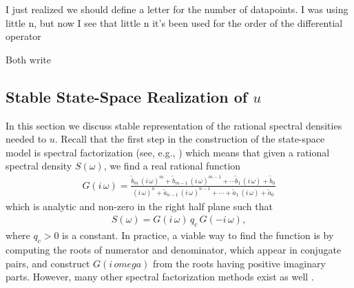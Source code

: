 \documentclass[journal]{IEEEtran}
\newcommand{\mauricio}[1]{{\color{blue}#1}}
\newcommand{\simo}[1]{{\color{red}#1}}
\begin{document}
\mauricio{I just realized we should define a letter for the number of datapoints. I was using little n, but now I see
that little n it's been used for the order of the differential operator}

\simo{Both write}

\subsection{Stable State-Space Realization of $u$}
%
In this section we discuss stable representation of the rational spectral densities needed to $u$. Recall that the first step in the construction of the state-space model is spectral factorization (see, e.g., \cite{Hartikainen+Sarkka:2010, Sarkka+Hartikainen:2012, Sarkka+Solin+Hartikainen:2013}) which means that given a rational spectral density $S(\omega)$, we find a real rational function
%
\begin{equation}
\begin{split}
 G(i \, \omega)
 = \frac{\tilde{b}_m \, (i \, \omega)^m + \tilde{b}_{m-1} \, (i \, \omega)^{m-1} + \cdots
   \tilde{b}_1 \, (i \, \omega) + \tilde{b}_0}
   {(i \, \omega)^n + \tilde{a}_{n-1} \, (i \, \omega)^{n-1} + \cdots + \tilde{a}_1 \, (i \, \omega) + \tilde{a}_0}
\end{split}
\label{eq:trans2}
\end{equation}
%
which is analytic and non-zero in the right half plane such that
%
\begin{equation}
\begin{split}
  S(\omega) = G(i \, \omega) \, q_c \, G(-i \, \omega),
\end{split}
\end{equation}
%
where $q_c > 0$ is a constant. In practice, a viable way to find the function is by computing the roots of numerator and denominator, which appear in conjugate pairs, and construct $G(i \, omega)$ from the roots having positive imaginary parts. However, many other spectral factorization methods exist as well \cite{Ref-to-spec-fact-survey}.
\end{document}
